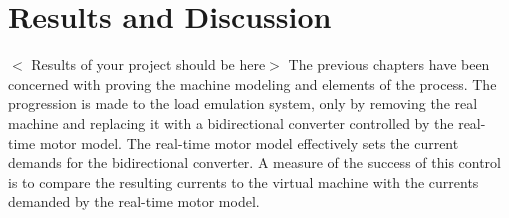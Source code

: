 \chapter{Results and Discussion}
$<$ Results of your project should be here$>$\newline
The previous chapters have been concerned with proving the machine modeling and elements of the process. The progression is made to the load emulation system, only by removing the real machine and replacing it with a bidirectional converter controlled by the real-time motor model. The real-time motor model effectively sets the current demands for the bidirectional converter. A measure of the success of this control is to compare the resulting currents to the virtual machine with the currents demanded by the real-time motor model. 
